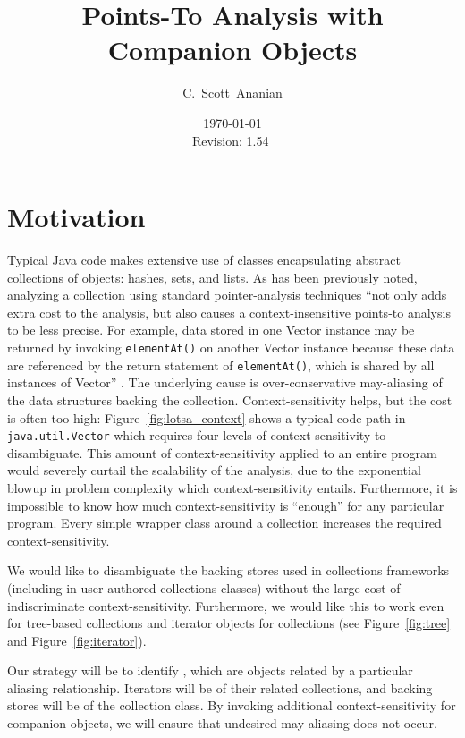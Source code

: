 \documentclass[11pt,notitlepage]{article}
\author{C.~Scott~Ananian}
\title{Points-To Analysis with Companion Objects}
\date{\today \\ $ $Revision: 1.54 $ $}
\begin{document}

\maketitle
\section{Motivation}
Typical Java code makes extensive use of classes encapsulating abstract
collections of objects: hashes, sets, and lists.  As has been
previously noted, analyzing a collection using standard pointer-analysis
techniques ``not only adds extra cost to the analysis, but also causes
a context-insensitive points-to analysis to be less precise.  For
example, data stored in one Vector instance may be returned by
invoking \texttt{elementAt()} on another Vector instance because these
data are referenced by the return statement of \texttt{elementAt()},
which is shared by all instances of Vector'' \cite[p. 75]{379676}.
The underlying cause is over-conservative may-aliasing of the data
structures backing the collection.  Context-sensitivity helps, but the
cost is often too high: Figure~\ref{fig:lotsa_context} shows a typical
code path in \texttt{java.util.Vector} which requires four levels of
context-sensitivity to disambiguate.  This amount of
context-sensitivity applied to an entire program would severely
curtail the scalability of the analysis, due to the exponential blowup
in problem complexity which context-sensitivity entails.  Furthermore,
it is impossible to know how much context-sensitivity is ``enough''
for any particular program.  Every simple wrapper class around a
collection increases the required context-sensitivity.

We would like to disambiguate the backing stores used in collections
frameworks (including in user-authored collections classes) without
the large cost of indiscriminate context-sensitivity.  Furthermore, we
would like this to work even for tree-based collections and iterator
objects for collections (see Figure~\ref{fig:tree} and
Figure~\ref{fig:iterator}).

Our strategy will be to identify , which
are objects related by a particular aliasing relationship.  Iterators
will be  of their related collections, and
backing stores will be  of the collection
class.  By invoking additional context-sensitivity for companion
objects, we will ensure that undesired may-aliasing does not occur.
\end{document}
